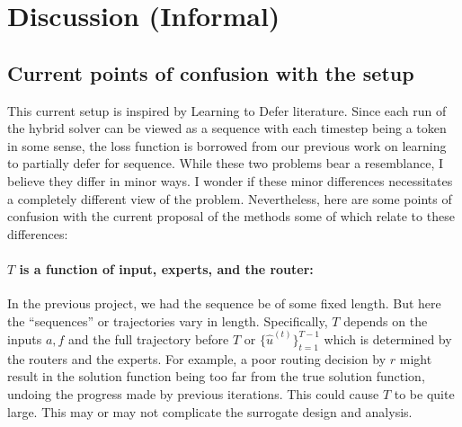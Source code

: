 \documentclass[12pt]{article}
\begin{document}


\section{Discussion (Informal)}

\subsection{Current points of confusion with the setup} \label{sec:confusions}

This current setup is inspired by Learning to Defer literature. Since each run of the hybrid solver can be viewed as a sequence with each timestep being a token in some sense, the loss function is borrowed from our previous work on learning to partially defer for sequence. While these two problems bear a resemblance, I believe they differ in minor ways. I wonder if these minor differences necessitates a completely different view of the problem. Nevertheless, here are some points of confusion with the current proposal of the methods some of which relate to these differences: 

\paragraph{$T$ is a function of input, experts, and the router:} 
In the previous project, we had the sequence be of some fixed length. But here the ``sequences'' or trajectories vary in length. Specifically, $T$ depends on the inputs $a, f$ and the full trajectory before $T$ or $\{\widehat{u}^{(t)}\}_{t =1}^{T - 1}$ which is determined by the routers and the experts. For example, a poor routing decision by $r$ might result in the solution function being too far from the true solution function, undoing the progress made by previous iterations. This could cause $T$ to be quite large. This may or may not complicate the surrogate design and analysis. 
\end{document}
